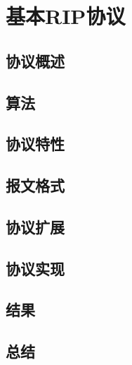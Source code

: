 \section{基本RIP协议} %
\label{sec:rip}
	\subsection{协议概述} %
	\label{sub:协议概述}
	
	\subsection{算法} %
	\label{sub:算法}
	
	\subsection{协议特性} %
	\label{sub:协议特性}
	
	\subsection{报文格式} %
	\label{sub:报文格式}
	
	\subsection{协议扩展} %
	\label{sub:协议扩展}
	
	\subsection{协议实现} %
	\label{sub:协议实现}
	
	\subsection{结果} %
	\label{sub:结果}
	
	\subsection{总结} %
	\label{sub:总结}
	
